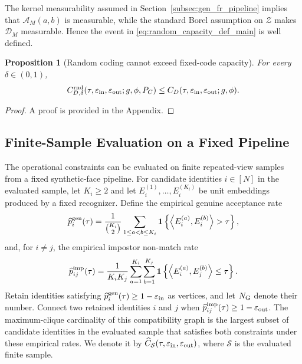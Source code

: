 \documentclass[journal]{IEEEtran}
\newtheorem{proposition}[theorem]{Proposition}
\begin{document}
\begin{bibunit}
The kernel measurability assumed in Section~\ref{subsec:gen_fr_pipeline} implies that $\mathcal A_M(a,b)$ is measurable, while the standard Borel assumption on $\mathcal Z$ makes $\mathcal D_M$ measurable. Hence the event in \eqref{eq:random_capacity_def_main} is well defined.

\begin{proposition}[Random coding cannot exceed fixed-code capacity]
\label{prop:random_vs_deterministic_capacity}
%
For every $\delta\in(0,1)$,
%
\begin{equation}
C_{D,\delta}^{\mathrm{rnd}} (\tau,\varepsilon_{\rm in},\varepsilon_{\rm out};g,\phi,P_C)
\le C_D(\tau,\varepsilon_{\rm in},\varepsilon_{\rm out};g,\phi).
\label{eq:random_vs_deterministic_capacity}
\end{equation}
%
\end{proposition}

\begin{proof}
A proof is provided in the Appendix.
\end{proof}








\subsection{Finite-Sample Evaluation on a Fixed Pipeline}
\label{subsec:finite_sample_evaluation}

The operational constraints can be evaluated on finite repeated-view samples from a fixed synthetic-face pipeline. For candidate identities $i\in[N]$ in the evaluated sample, let $K_i\ge2$ and let $E_i^{(1)},\ldots,E_i^{(K_i)}$ be unit embeddings produced by a fixed recognizer. Define the empirical genuine acceptance rate
%
\begin{equation}
\widehat p_i^{\rm gen}(\tau) =\frac{1}{\binom{K_i}{2}}
\sum_{1\le a<b\le K_i} \mathbf 1 \left\{\left\langle E_i^{(a)},E_i^{(b)}\right\rangle>\tau\right\},
\label{eq:empirical_genuine_rate}
\end{equation}
%
and, for $i\ne j$, the empirical impostor non-match rate
%
\begin{equation}
\widehat p_{ij}^{\rm imp}(\tau) =\frac{1}{K_iK_j}
\sum_{a=1}^{K_i}\sum_{b=1}^{K_j} \mathbf 1 \left\{\left\langle E_i^{(a)},E_j^{(b)}\right\rangle\le\tau\right\}.
\label{eq:empirical_impostor_rate}
\end{equation}
%
Retain identities satisfying $\widehat p_i^{\rm gen}(\tau)\ge1-\varepsilon_{\rm in}$ as vertices, and let $N_{\rm G}$ denote their number. Connect two retained identities $i$ and $j$ when $\widehat p_{ij}^{\rm imp}(\tau)\ge1-\varepsilon_{\rm out}$. The maximum-clique cardinality of this compatibility graph is the largest subset of candidate identities in the evaluated sample that satisfies both constraints under these empirical rates. We denote it by $\widehat C_{\mathcal S}(\tau,\varepsilon_{\rm in},\varepsilon_{\rm out})$, where $\mathcal S$ is the evaluated finite sample.


\end{bibunit}
\end{document}
